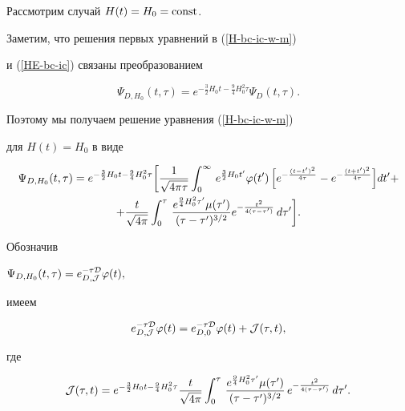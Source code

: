 Рассмотрим случай $H(t)=H_0=\rm const$.

Заметим, что решения первых уравнений в (\ref{H-bc-ic-w-m})

и (\ref{HE-bc-ic}) связаны преобразованием

\begin{equation*}

\Psi_{D,H_0}(t,\tau)=e^{-\frac32H_0t-\frac94H_0^2\tau}\Psi_{D}(t,\tau).

\end{equation*}

Поэтому мы получаем решение уравнения (\ref{H-bc-ic-w-m})

 для $H(t)=H_0$ в виде

\begin{multline*}

\Psi_{D,H_0}(t,\tau)=e^{-\frac32H_0t-\frac94H_0^2\tau}\biggl[\frac{1}{\sqrt{4\pi \tau}}

\int _0^\infty \,

e^{\frac32H_0t^\prime}\varphi(t^\prime)\,

\Bigl[e^{-\frac{(t-t')^2}{4\tau}}-e^{-\frac{(t+t')^2}{4\tau}}\Bigr]dt' +\\

+\frac{t}{\sqrt{4\pi }}\int _0^\tau\,

\frac{e^{\frac94H_0^2\tau'}\mu(\tau')}{(\tau-\tau')^{3/2}}e^{-\frac{t^2}{4(\tau-\tau')}}\,d\tau'\biggr].


\end{multline*}

 Обозначив 

$\Psi_{D,H_0}(t,\tau)=e^{-\tau{\cal D}}_{D,{\cal J}}\varphi(t),$

имеем

\begin{equation*}

e^{-\tau{\cal D}}_{D,{\cal J}} \varphi(t)=

e^{-\tau{\cal D}}_{D,0} \varphi(t)+{\cal J}(\tau,t),\end{equation*}

где

\begin{equation*}

{\cal J}(\tau,t)= e^{-\frac32H_0t-\frac94H_0^2\tau}\frac{t}{\sqrt{4\pi }}\int _0^\tau\,

\frac{e^{\frac94H_0^2\tau'}\mu(\tau')}{(\tau-\tau')^{3/2}}\,e^{-\frac{t^2}{4(\tau-\tau')}}\,d\tau'.

\end{equation*}

